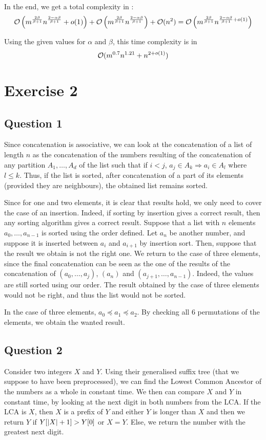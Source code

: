 \documentclass{cours}
\begin{document}
        In the end, we get a total complexity in : 
        \[
            \mathcal{O}\left(m^{\frac{2\beta}{\beta + 1}}n^{\frac{2 - \alpha \beta}{\beta + 1}} + o(1)\right) + \mathcal{O}\left(m^{\frac{2\beta}{\beta + 1}}n^{\frac{2 - \alpha \beta}{\beta + 1}}\right) + \mathcal{O}(n^{2}) = \mathcal{O}\left(m^{\frac{2\beta}{\beta + 1}}n^{\frac{2 - \alpha \beta}{\beta + 1} + o(1)}\right)
        \]

        Using the given values for $\alpha$ and $\beta$, this time complexity is in \[\mathcal{O}(m^{0.7}n^{1.21} + n^{2 + o(1)})\]   

    \section{Exercise 2}
        \subsection{Question 1}
            Since concatenation is associative, we can look at the concatenation of a list of length $n$ as the concatenation of the numbers resulting of the concatenation of any partition $A_{1}, \ldots, A_{d}$ of the list such that if $i < j$, $a_{j} \in A_{k} \Rightarrow a_{i} \in A_{l}$ where $l \leq k$. Thus, if the list is sorted, after concatenation of a part of its elements (provided they are neighbours), the obtained list remains sorted. 
            
            Since for one and two elements, it is clear that results hold, we only need to cover the case of an insertion. Indeed, if sorting by insertion gives a correct result, then any sorting algorithm gives a correct result. Suppose that a list with $n$ elements $a_{0}, \ldots, a_{n- 1}$ is sorted using the order defined. Let $a_{n}$ be another number, and suppose it is inserted between $a_{i}$ and $a_{i + 1}$ by insertion sort.
            Then, suppose that the result we obtain is not the right one. We return to the case of three elements, since the final concatenation can be seen as the one of the results of the concatenation of $(a_{0}, \ldots, a_{j})$, $(a_{n})$ and $(a_{j + 1}, \ldots, a_{n - 1})$. Indeed, the values are still sorted using our order. The result obtained by the case of three elements would not be right, and thus the list would not be sorted. 

            In the case of three elements, $a_{0} \preceq a_{1} \preceq a_{2}$. By checking all $6$ permutations of the elements, we obtain the wanted result. 

        \subsection{Question 2}
            Consider two integers $X$ and $Y$. Using their generalised suffix tree (that we suppose to have been preprocessed), we can find the Lowest Common Ancestor of the numbers as a whole in constant time. We then can compare $X$ and $Y$ in constant time, by looking at the next digit in both numbers from the LCA. If the LCA is $X$, then $X$ is a prefix of $Y$ and either $Y$ is longer than $X$ and then we return $Y$ if $Y[\left|X\right| + 1] > Y[0]$ or $X = Y$. Else, we return the number with the greatest next digit. 
        
\end{document}
